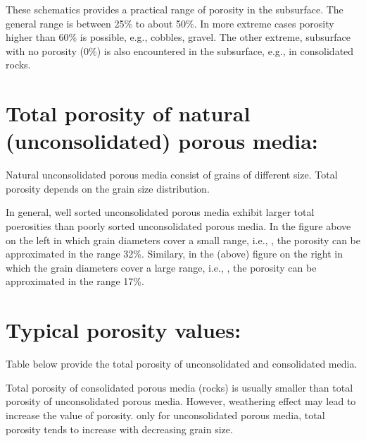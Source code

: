 \documentclass[letterpaper,10pt,english]{jupyterBook}
\let\sphinxpxdimen\pdfpxdimen\else\newdimen\sphinxpxdimen
\begin{document}
\sphinxAtStartPar
These schematics provides a practical range of porosity in the subsurface. The general range is between 25\% to about 50\%. In more extreme cases porosity higher than 60\% is possible, e.g., cobbles, gravel. The other extreme, subsurface with no porosity (0\%) is also encountered in the subsurface, e.g., in consolidated rocks.


\section{Total porosity of natural (unconsolidated) porous media:}
\label{\detokenize{content/flow/12_subsurface_structure:total-porosity-of-natural-unconsolidated-porous-media}}
\sphinxAtStartPar
Natural unconsolidated porous media consist of grains of different size. Total porosity depends on the grain size distribution.



\noindent{\hspace*{\fill}\sphinxincludegraphics[width=600\sphinxpxdimen]{{L02_fig5b}.png}\hspace*{\fill}}



\sphinxAtStartPar
In general, well sorted unconsolidated porous media exhibit larger total poerosities than poorly sorted unconsolidated porous media. In the figure above on the left in which grain diameters cover a small range, i.e., , the porosity can be approximated in the range 32\%. Similary, in the (above) figure on the right in which the grain diameters cover a large range, i.e., , the porosity can be approximated in the range 17\%.


\section{Typical porosity values:}
\label{\detokenize{content/flow/12_subsurface_structure:typical-porosity-values}}
\sphinxAtStartPar
Table below provide the total porosity of unconsolidated and consolidated media.

\sphinxAtStartPar
Total porosity of consolidated porous media (rocks) is usually smaller than total porosity of unconsolidated porous media. However, weathering effect may lead to increase the value of porosity.
only for unconsolidated porous media, total porosity tends to increase with decreasing grain size.
\end{document}
